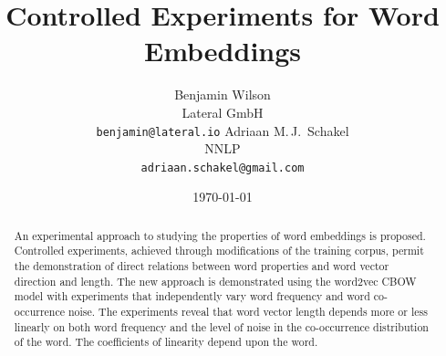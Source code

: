 \documentclass{article} %
\title{Controlled Experiments for Word Embeddings}
\author{
 	Benjamin Wilson\\
	Lateral GmbH\\
	\texttt{benjamin@lateral.io}
	\And
	Adriaan M.\,J.\, Schakel\\
	NNLP\\
	\texttt{adriaan.schakel@gmail.com}
 }
\date{\today}
\begin{document}
\graphicspath{{../outputs/}}
\maketitle

\begin{abstract}
	An experimental approach to studying the properties of word
        embeddings is proposed.  Controlled experiments, achieved
        through modifications of the training corpus, permit the
        demonstration of direct relations between word properties and
        word vector direction and length.  The new approach is
        demonstrated using the word2vec CBOW model with experiments that
        independently vary word frequency and word co-occurrence noise.
        The experiments reveal that word vector length depends more or
        less linearly on both word frequency and the level of noise in
        the co-occurrence distribution of the word.  The coefficients of
        linearity depend upon the word.
\end{abstract} 
\end{document}
